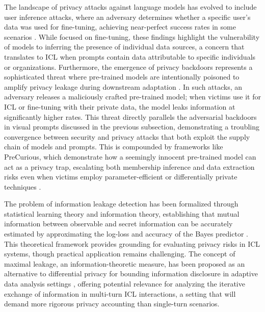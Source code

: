 \documentclass[11pt]{article}
\begin{document}
The landscape of privacy attacks against language models has evolved to include user inference attacks, where an adversary determines whether a specific user's data was used for fine-tuning, achieving near-perfect success rates in some scenarios \cite{ref446}. While focused on fine-tuning, these findings highlight the vulnerability of models to inferring the presence of individual data sources, a concern that translates to ICL when prompts contain data attributable to specific individuals or organizations. Furthermore, the emergence of privacy backdoors represents a sophisticated threat where pre-trained models are intentionally poisoned to amplify privacy leakage during downstream adaptation \cite{ref447}. In such attacks, an adversary releases a maliciously crafted pre-trained model; when victims use it for ICL or fine-tuning with their private data, the model leaks information at significantly higher rates. This threat directly parallels the adversarial backdoors in visual prompts discussed in the previous subsection, demonstrating a troubling convergence between security and privacy attacks that both exploit the supply chain of models and prompts. This is compounded by frameworks like PreCurious, which demonstrate how a seemingly innocent pre-trained model can act as a privacy trap, escalating both membership inference and data extraction risks even when victims employ parameter-efficient or differentially private techniques \cite{ref448}.

The problem of information leakage detection has been formalized through statistical learning theory and information theory, establishing that mutual information between observable and secret information can be accurately estimated by approximating the log-loss and accuracy of the Bayes predictor \cite{ref449}. This theoretical framework provides grounding for evaluating privacy risks in ICL systems, though practical application remains challenging. The concept of maximal leakage, an information-theoretic measure, has been proposed as an alternative to differential privacy for bounding information disclosure in adaptive data analysis settings \cite{ref450}, offering potential relevance for analyzing the iterative exchange of information in multi-turn ICL interactions, a setting that will demand more rigorous privacy accounting than single-turn scenarios.
\end{document}
